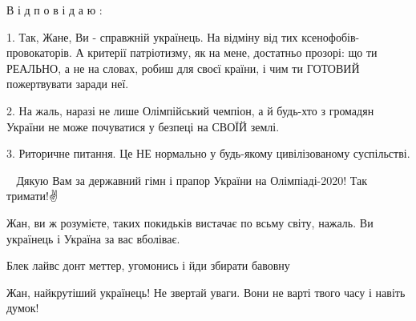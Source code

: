 \begin{itemize}
 
В і д п о в і д а ю :

1. Так, Жане, Ви - справжній українець. На відміну від тих
ксенофобів-провокаторів. А критерії патріотизму, як на мене, достатньо прозорі:
що ти РЕАЛЬНО, а не на словах, робиш для своєї країни, і чим ти ГОТОВИЙ
пожертвувати заради неї.

2. На жаль, наразі не лише Олімпійський чемпіон, а й будь-хто з громадян
України не може почуватися у безпеці на СВОЇЙ землі.

3. Риторичне питання. Це НЕ нормально у будь-якому цивілізованому суспільстві.

💙💛 Дякую Вам за державний гімн і прапор України на Олімпіаді-2020! Так тримати!✌

 
Жан, ви ж розумієте, таких покидьків вистачає по всьму світу, нажаль. Ви українець і Україна за вас вболіває.

 
Блек лайвс донт меттер, угомонись і йди збирати бавовну

 
Жан, найкрутіший українець! Не звертай уваги. Вони не варті твого часу і навіть думок!

 

\end{itemize}

